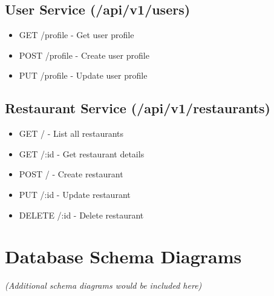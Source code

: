 \documentclass[12pt,a4paper]{article}
\begin{document}
\subsection{User Service (/api/v1/users)}
\begin{itemize}
    \item GET /profile - Get user profile
    \item POST /profile - Create user profile
    \item PUT /profile - Update user profile
\end{itemize}

\subsection{Restaurant Service (/api/v1/restaurants)}
\begin{itemize}
    \item GET / - List all restaurants
    \item GET /:id - Get restaurant details
    \item POST / - Create restaurant
    \item PUT /:id - Update restaurant
    \item DELETE /:id - Delete restaurant
\end{itemize}

\section{Database Schema Diagrams}

\textit{(Additional schema diagrams would be included here)}
\end{document}
